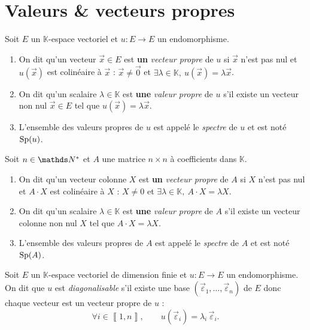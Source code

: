 \section{Valeurs \& vecteurs propres}

\begin{defn}
	Soit $E$\/ un $\mathds{K}$-espace vectoriel et $u: E \to E$\/ un endomorphisme.
	\begin{enumerate}
		\item On dit qu'un vecteur $\vec{x} \in E$\/ est {\bf un}\/ {\it vecteur propre}\/ de $u$\/ si $\vec{x}$\/ n'est pas nul et $u(\vec{x})$\/ est colinéaire à $\vec{x}$\/ : $\vec{x} \neq \vec{0}$\/ et $\exists  \lambda \in \mathds{K},\:u(\vec{x}) = \lambda \vec{x}$.
		\item On dit qu'un scalaire $\lambda \in \mathds{K}$\/ est {\bf une}\/ {\it valeur propre}\/ de $u$\/ s'il existe un vecteur non nul $\vec{x} \in E$\/ tel que $u(\vec{x}) = \lambda \vec{x}$.
		\item L'ensemble des valeurs propres de $u$\/ est appelé le {\it spectre}\/ de $u$\/ et est noté $\operatorname{Sp}(u)$.
	\end{enumerate}
\end{defn}

\begin{defn}
	Soit $n \in \N^*$\/ et $A$\/ une matrice $n\times n$\/ à coefficients dans $\mathds{K}$.
	\begin{enumerate}
		\item On dit qu'un vecteur colonne $X$\/ est {\bf un}\/ {\it vecteur propre}\/ de $A$\/ si $X$\/ n'est pas nul et $A\cdot X$\/ est colinéaire à $X$\/ : $X \neq 0$\/ et $\exists  \lambda \in \mathds{K},\:A\cdot X = \lambda X$.
		\item On dit qu'un scalaire $\lambda \in \mathds{K}$\/ est {\bf une}\/ {\it valeur propre}\/ de $A$\/ s'il existe un vecteur colonne non nul $X$\/ tel que $A \cdot X = \lambda X$.
		\item L'ensemble des valeurs propres de $A$\/ est appelé le {\it spectre}\/ de $A$\/ et est noté $\operatorname{Sp}(A)$.
	\end{enumerate}
\end{defn}

\begin{defn}
	Soit $E$\/ un $\mathds{K}$-espace vectoriel de dimension finie et $u:E\to E$\/ un endomorphisme.
	On dit que $u$\/ est {\it diagonalisable}\/ s'il existe une base $(\vec{\varepsilon}_1,\ldots,\vec{\varepsilon}_n)$\/ de $E$\/ donc chaque vecteur est un vecteur propre de $u$\/ : \[
		\forall i \in \left\llbracket 1,n \right\rrbracket,\qquad u(\vec{\varepsilon}_i) = \lambda_i\,\vec{\varepsilon}_i
	.\]
\end{defn}


